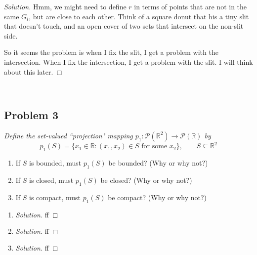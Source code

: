 \documentclass{article}
\newcommand{\R}{{\mathbb R}}
\begin{document}
\begin{proof}[Solution]
	Hmm, we might need to define $r$ in terms of points that are
	not in the same $G_i$, but are close to each other.
	Think of a square donut that his a tiny slit that doesn't touch,
	and an open cover of two sets that intersect on the non-slit side.

	So it seems the problem is when I fix the slit,
	I get a problem with the intersection.
	When I fix the intersection, I get a problem with the slit.
	I will think about this later.
\end{proof}
\clearpage
~\clearpage

\subsection*{Problem 3}
{\it Define the set-valued ``projection" mapping
$p_1 \colon \mathcal{P}(\R^2) \to \mathcal{P}(\R)$ by
\[
	p_1(S) = \{x_1 \in \R \colon (x_1,x_2) \in S \text{ for some }x_2\},
	\qquad S \subseteq \R^2
\]
\begin{enumerate}
	\item If $S$ is bounded, must $p_1(S)$ be bounded? (Why or why not?)
	\item If $S$ is closed, must $p_1(S)$ be closed? (Why or why not?)
	\item If $S$ is compact, must $p_1(S)$ be compact? (Why or why not?)
\end{enumerate}}

\begin{enumerate}
	\item \begin{proof}[Solution]\let\qed\relax
		ff
	\end{proof}
	\item \begin{proof}[Solution]\let\qed\relax
		ff
	\end{proof}
	\item \begin{proof}[Solution]\let\qed\relax
		ff
	\end{proof}
\end{enumerate}
\clearpage
~\clearpage
\end{document}
